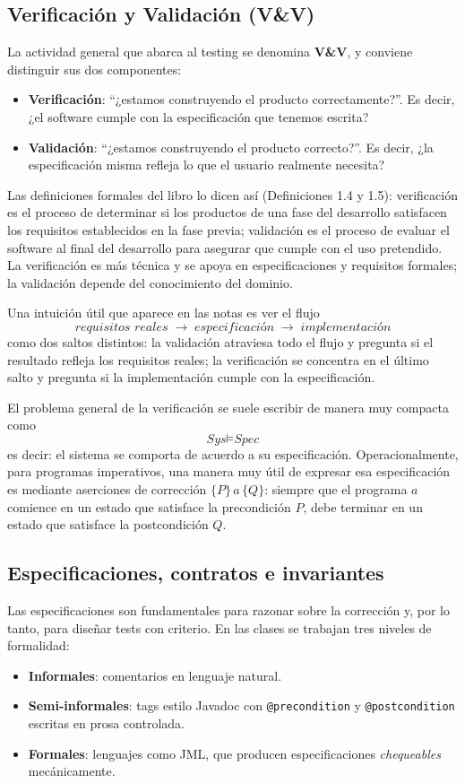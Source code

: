 \documentclass[12pt,a4paper]{article}
\begin{document}
\subsection{Verificación y Validación (V\&V)}
La actividad general que abarca al testing se denomina \textbf{V\&V}, y conviene distinguir sus dos componentes:

\begin{itemize}
  \item \textbf{Verificación}: ``¿estamos construyendo el producto correctamente?''. Es decir, ¿el software cumple con la especificación que tenemos escrita?
  \item \textbf{Validación}: ``¿estamos construyendo el producto correcto?''. Es decir, ¿la especificación misma refleja lo que el usuario realmente necesita?
\end{itemize}

Las definiciones formales del libro lo dicen así (Definiciones 1.4 y 1.5): verificación es el proceso de determinar si los productos de una fase del desarrollo satisfacen los requisitos establecidos en la fase previa; validación es el proceso de evaluar el software al final del desarrollo para asegurar que cumple con el uso pretendido. La verificación es más técnica y se apoya en especificaciones y requisitos formales; la validación depende del conocimiento del dominio.

Una intuición útil que aparece en las notas es ver el flujo
\[
\textit{requisitos reales} \;\longrightarrow\; \textit{especificación} \;\longrightarrow\; \textit{implementación}
\]
como dos saltos distintos: la validación atraviesa todo el flujo y pregunta si el resultado refleja los requisitos reales; la verificación se concentra en el último salto y pregunta si la implementación cumple con la especificación.

El problema general de la verificación se suele escribir de manera muy compacta como
\[
\textit{Sys} \models \textit{Spec}
\]
es decir: el sistema se comporta de acuerdo a su especificación. Operacionalmente, para programas imperativos, una manera muy útil de expresar esa especificación es mediante aserciones de corrección $\{P\}\, a\, \{Q\}$: siempre que el programa $a$ comience en un estado que satisface la precondición $P$, debe terminar en un estado que satisface la postcondición $Q$.

\subsection{Especificaciones, contratos e invariantes}
Las especificaciones son fundamentales para razonar sobre la corrección y, por lo tanto, para diseñar tests con criterio. En las clases se trabajan tres niveles de formalidad:
\begin{itemize}
  \item \textbf{Informales}: comentarios en lenguaje natural.
  \item \textbf{Semi-informales}: tags estilo Javadoc con \texttt{@precondition} y \texttt{@postcondition} escritas en prosa controlada.
  \item \textbf{Formales}: lenguajes como JML, que producen especificaciones \textit{chequeables} mecánicamente.
\end{itemize}
\end{document}
